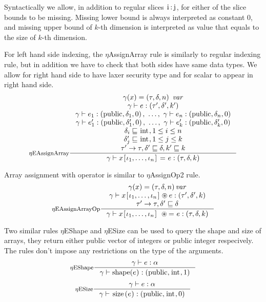 \documentclass[a4paper, 10pt, draft]{report}
\newcommand{\mycode}[1]{\ensuremath{\mbox{\lstinline{#1}}}}
\begin{document}
Syntactically we allow, in addition to regular slices \mycode{i:j}, for either
of the slice bounds to be missing. Missing lower bound is always interpreted as
constant $0$, and missing upper bound of $k$-th dimension is interpreted as
value that equals to the size of $k$-th dimension.

For left hand side indexing, the $\eta$AssignArray rule is similarly to regular
indexing rule, but in addition we have to check that both sides have same data
types. We allow for right hand side to have laxer security type and for scalar
to appear in right hand side.
\[ \inference[$\eta$EAssignArray]
{
  \gamma(x) = \left( \tau, \delta, n \right)\ \mathit{var}  \\
  \gamma |- e : \left(\tau', \delta', k'\right) \\
  \gamma |- e_1 : \left(\mycode{public}, \delta_1, 0 \right),\ \ldots,\ \gamma |- e_n : \left(\mycode{public}, \delta_n, 0 \right)\\
  \gamma |- e'_1 : \left(\mycode{public}, \delta'_1, 0 \right),\ \ldots,\ \gamma |- e'_k : \left(\mycode{public}, \delta'_k, 0 \right) \\
  \delta_i \sqsubseteq \mycode{int}, 1 \le i \le n \\
  \delta'_j \sqsubseteq \mycode{int}, 1 \le j \le k \\
  \tau' \to \tau, \delta' \sqsubseteq \delta, k' \sqsubseteq k
}
{
  \gamma |- x \mycode{[} \iota_1, \ldots, \iota_n \mycode{]}\ \mycode{=}\ e : \left(\tau, \delta, k\right)
} \]

Array assignment with operator is similar to $\eta$AssignOp2 rule.
\[ \inference[$\eta$EAssignArrayOp]
{
\gamma(x) = \left(\tau, \delta, n\right) \mathit{var} \\
  \gamma |-  x \mycode{[} \iota_1, \ldots, \iota_n \mycode{]} \circledast e : \left(\tau', \delta', k\right) \\
  \tau' \to \tau, \delta' \sqsubseteq \delta
}
{
  \gamma |- x \mycode{[} \iota_1, \ldots, \iota_n \mycode{]}\ \circledast \mycode{=}\ e : \left(\tau, \delta, k\right)
} \]

Two similar rules $\eta$EShape and $\eta$ESize  can be used to query the shape
and size of arrays, they return either public vector of integers or public
integer respecively. The rules don't impose any restrictions on the
type of the arguments.
\[ \inference[$\eta$EShape]
{
  \gamma |- e : \alpha
}
{
  \gamma |- \mycode{shape(} e \mycode{)} : \left(\mycode{public}, \mycode{int}, 1\right)
} \]
\[ \inference[$\eta$ESize]
{
  \gamma |- e : \alpha
}
{
  \gamma |- \mycode{size(} e \mycode{)} : \left(\mycode{public}, \mycode{int}, 0\right)
} \]
\end{document}
